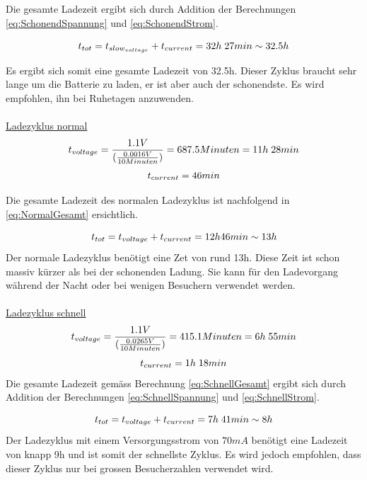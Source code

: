 Die gesamte Ladezeit ergibt sich durch Addition der Berechnungen \ref{eq:SchonendSpannung} und \ref{eq:SchonendStrom}.

\begin{equation}
\centering
t_{tot}=t_{slow_{voltage}}+t_{current}=32h\thickspace 27min \sim 32.5h
\label{eq:SchonendGesamt}
\end{equation}

Es ergibt sich somit eine gesamte Ladezeit von 32.5h. Dieser Zyklus braucht sehr lange um die Batterie zu laden, er ist aber auch der schonendste. Es wird empfohlen, ihn bei Ruhetagen anzuwenden.
\\
\\


\underline{Ladezyklus normal}
\begin{equation}
\centering
t_{voltage}=\frac{1.1 V}{(\frac{0.0016 V}{10 Minuten})}=687.5 Minuten= 11h\thickspace 28min
\label{eq:NormalSpannung}
\end{equation}
\begin{equation}
\centering
t_{current}= 46min
\label{eq:NormalStrom}
\end{equation}

Die gesamte Ladezeit des normalen Ladezyklus ist nachfolgend in \ref{eq:NormalGesamt} ersichtlich.

\begin{equation}
\centering
t_{tot}=t_{voltage}+t_{current}=12h\space 46min \sim 13h
\label{eq:NormalGesamt}
\end{equation}
Der normale Ladezyklus benötigt eine Zet von rund 13h. Diese Zeit ist schon massiv kürzer als bei der schonenden Ladung. Sie kann für den Ladevorgang während der Nacht oder bei wenigen Besuchern verwendet werden.
\\
\\


\underline{Ladezyklus schnell}
\begin{equation}
\centering
t_{voltage}=\frac{1.1 V}{(\frac{0.0265 V}{10 Minuten})}=415.1 Minuten= 6h\thickspace 55min
\label{eq:SchnellSpannung}
\end{equation}
\begin{equation}
\centering
t_{current}= 1h\thickspace 18min
\label{eq:SchnellStrom}
\end{equation}
Die gesamte Ladezeit gemäss Berechnung \ref{eq:SchnellGesamt} ergibt sich durch Addition der Berechnungen \ref{eq:SchnellSpannung} und \ref{eq:SchnellStrom}.

\begin{equation}
\centering
t_{tot}=t_{voltage}+t_{current}=7h\thickspace 41min \sim 8h
\label{eq:SchnellGesamt}
\end{equation}
Der Ladezyklus mit einem Versorgungsstrom von $70mA$ benötigt eine Ladezeit von knapp 9h und ist somit der schnellste Zyklus. Es wird jedoch empfohlen, dass dieser Zyklus nur bei grossen Besucherzahlen verwendet wird.
\\
\\

